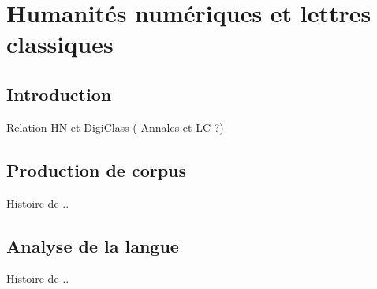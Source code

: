 \section{Humanités numériques et lettres classiques}
\label{sec:digitalclassics}

\subsection{Introduction}
\label{subsec:dc_intro}

Relation HN et DigiClass ( Annales et LC ?)

\subsection{Production de corpus}
\label{subsec:dc_histoirecorpus}

Histoire de ..

\subsection{Analyse de la langue}
\label{subsec:dc_langue}

Histoire de ..
